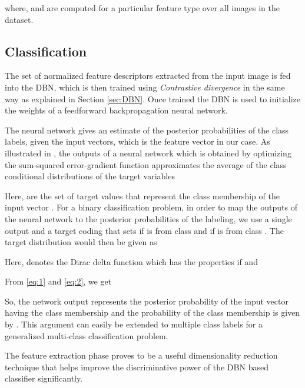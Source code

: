 \documentclass[11pt,a4paper]{article}
\begin{document}
where,  and  are computed for a particular feature type over all images in the dataset.

\subsection{Classification}
The set of normalized feature descriptors extracted from the input image is fed into the DBN, which is then trained using \emph{Contrastive divergence} in the same way as explained in Section \ref{sec:DBN}. Once trained the DBN is used to initialize the weights of a feedforward backpropagation neural network. 

The neural network gives an estimate of the posterior probabilities of the class labels, given the input vectors, which is the feature vector in our case. As illustrated in \cite{Bishop1995}, the outputs of a neural network which is obtained by optimizing the sum-squared error-gradient function approximates the average of the class conditional distributions of the target variables



Here,  are the set of target values that represent the class membership of the input vector . For a binary classification problem, in order to map the outputs of the neural network to the posterior probabilities of the labeling, we use a single output  and a target coding that sets  if  is from class  and  if  is from class . The target distribution would then be given as



Here,  denotes the Dirac delta function which has the properties  if  and

 

From \ref{eq:1} and \ref{eq:2}, we get

        							        

So, the network output  represents the posterior probability of the input vector  having the class membership  and the probability of the class membership  is given by . This argument can easily be extended to multiple class labels for a generalized multi-class classification problem. 

The feature extraction phase proves to be a useful dimensionality reduction technique that helps improve the discriminative power of the DBN based classifier significantly.
\end{document}
